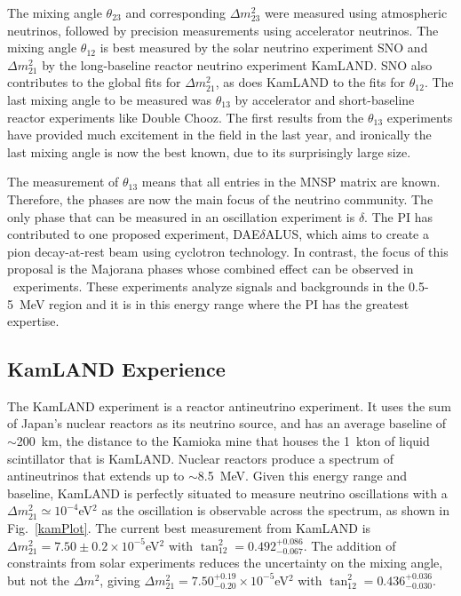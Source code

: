 The mixing angle $\theta_{23}$ and corresponding $\Delta m^{2}_{23}$ were measured using atmospheric neutrinos\cite{skatm}, followed by precision measurements using accelerator neutrinos\cite{minos}.  The mixing angle  $\theta_{12}$ is best measured by the solar neutrino experiment SNO\cite{snoboron}  and  $\Delta m^{2}_{21}$ by the long-baseline reactor neutrino experiment KamLAND\cite{Gando:2010aa}. SNO also contributes to the global fits for $\Delta m^{2}_{21}$, as does KamLAND to the fits for $\theta_{12}$.  The last mixing angle to be measured was $\theta_{13}$ by accelerator and short-baseline reactor experiments like Double Chooz. The first results from the $\theta_{13}$ experiments have provided much excitement in the field in the last year, and ironically the last mixing angle is now the best known, due to its surprisingly large size.

The measurement of $\theta_{13}$ means that all entries in the MNSP matrix are known. Therefore, the phases are now the main focus of the neutrino community. The only phase that can be measured in an oscillation experiment is $\delta$. The PI has contributed to one proposed experiment, DAE$\delta$ALUS\cite{Alonso:2010fs}, which aims to create a pion decay-at-rest beam using cyclotron technology. In contrast, the focus of this proposal is the Majorana phases whose combined effect can be observed in \zeronu~experiments. These experiments analyze signals and backgrounds in the 0.5-5~MeV region and it is in this energy range where the PI has the greatest expertise.

\subsection{KamLAND Experience}
The KamLAND experiment is a reactor antineutrino experiment. It uses the sum of Japan's nuclear reactors as its neutrino source, and has an average baseline of $\sim$200~km, the distance to the Kamioka mine that houses the 1~kton of liquid scintillator that is KamLAND. Nuclear reactors produce a spectrum of antineutrinos that extends up to $\sim$8.5~MeV. Given this energy range and baseline, KamLAND is perfectly situated to measure neutrino oscillations with a $\Delta m^{2}_{21}\simeq10^{-4}$eV$^{2}$ as the oscillation is observable across the spectrum, as shown in Fig.~\ref{kamPlot}\cite{Eguchi:2002dm, Araki:2004mb,Abe:2008aa}. The current best measurement from KamLAND is $\Delta m^{2}_{21}=7.50\pm0.2\times10^{-5}$eV$^{2}$ with $\tan^{2}_{12}=0.492_{-0.067}^{+0.086}$\cite{Gando:2010aa}. The addition of constraints from solar experiments reduces the uncertainty on the mixing angle, but not the $\Delta m^{2}$,  giving $\Delta m^{2}_{21}=7.50_{-0.20}^{+0.19}\times10^{-5}$eV$^{2}$ with $\tan^{2}_{12}=0.436_{-0.030}^{+0.036}$.

